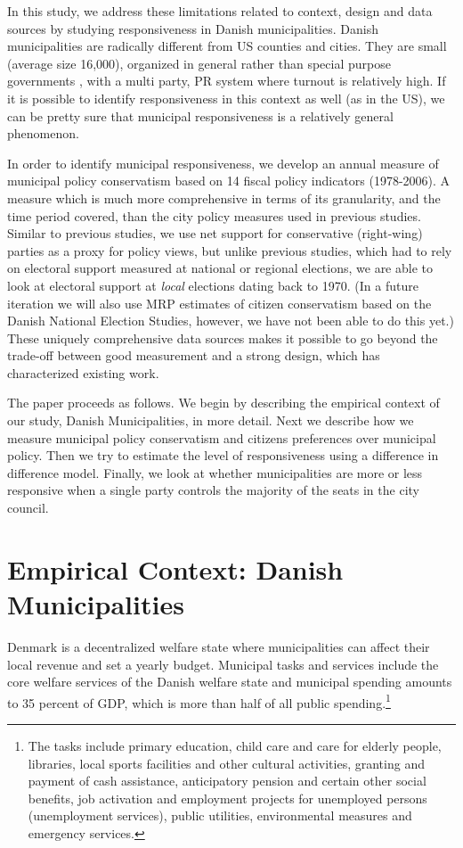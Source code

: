 \documentclass[a4paper,12pt]{article}
\begin{document}
In this study, we address these limitations related to context, design and data sources by studying responsiveness in Danish municipalities. Danish municipalities are radically different from US counties and cities. They are small (average size 16,000), organized in general rather than special purpose governments \citep{berry2009imperfect}, with a multi party, PR system where turnout is relatively high. If it is possible to identify responsiveness in this context as well (as in the US), we can be pretty sure that municipal responsiveness is a relatively general phenomenon.

In order to identify municipal responsiveness, we develop an annual measure of municipal policy conservatism based on 14 fiscal policy indicators (1978-2006). A measure which is much more comprehensive in terms of its granularity, and the time period covered, than the city policy measures used in previous studies. Similar to previous studies, we use net support for conservative (right-wing) parties as a proxy for policy views, but unlike previous studies, which had to rely on electoral support measured at national or regional elections, we are able to look at electoral support at \textit{local} elections dating back to 1970. (In a future iteration we will also use MRP estimates of citizen conservatism based on the Danish National Election Studies, however, we have not been able to do this yet.) These uniquely comprehensive data sources makes it possible to go beyond the trade-off between good measurement and a strong design, which has characterized existing work. 

The paper proceeds as follows. We begin by describing the empirical context of our study, Danish Municipalities, in more detail. Next we describe how we measure municipal policy conservatism and citizens preferences over municipal policy. Then we try to estimate the level of responsiveness using a difference in difference model. Finally, we look at whether municipalities are more or less responsive when a single party controls the majority of the seats in the city council.



\section{Empirical Context: Danish Municipalities}	
Denmark is a decentralized welfare state where municipalities can affect their local revenue and set a yearly budget.  Municipal tasks and services include the core welfare services of the Danish welfare state and municipal spending amounts to 35 percent of GDP, which is more than half of all public spending.\footnote{The tasks include primary education, child care and care for elderly people, libraries, local sports facilities and other cultural activities, granting and payment of cash assistance, anticipatory pension and certain other social benefits, job activation and employment projects for unemployed persons (unemployment services), public utilities, environmental measures and emergency services.}
\end{document}
